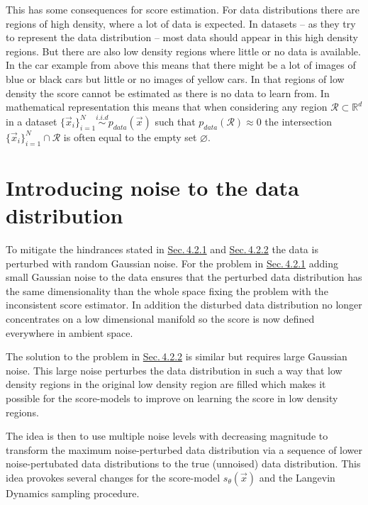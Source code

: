 This has some consequences for score estimation. For data distributions there are regions of high density, where a lot of data is expected. In datasets – as they try to represent the data distribution – most data should appear in this high density regions. But there are also low density regions where little or no data is available. In the car example from above this means that there might be a lot of images of blue or black cars but little or no images of yellow cars. In that regions of low density the score cannot be estimated as there is no data to learn from. In mathematical representation this means that when considering any region $\mathcal{R}\subset\mathbb{R}^d$ in a dataset $\{\vec{x}_i\}_{i=1}^N\overset{i.i.d}{\sim}p_{data}(\vec{x})$ such that $p_{data}(\mathcal{R})\approx0$ the intersection $\{\vec{x}_i\}_{i=1}^N\cap\mathcal{R}$ is often equal to the empty set $\varnothing$. 

\section[Introducing noise to the data distribution]{Introducing noise to the data distribution%
    } \label{sec:4.3}
To mitigate the hindrances stated in \hyperref[sec:4.2.1]{Sec.\,4.2.1} and \hyperref[sec:4.2.2]{Sec.\,4.2.2} the data is perturbed with random Gaussian noise. For the problem in \hyperref[sec:4.2.1]{Sec.\,4.2.1} adding small Gaussian noise to the data ensures that the perturbed data distribution has the same dimensionality than the whole space fixing the problem with the inconsistent score estimator. In addition the disturbed data distribution no longer concentrates on a low dimensional manifold so the score is now defined everywhere in ambient space.

The solution to the problem in \hyperref[sec:4.2.2]{Sec.\,4.2.2} is similar but requires large Gaussian noise. This large noise perturbes the data distribution in such a way that low density regions in the original low density region are filled which makes it possible for the score-models to improve on learning the score in low density regions.

The idea is then to use multiple noise levels with decreasing magnitude to transform the maximum noise-perturbed data distribution via a sequence of lower noise-pertubated data distributions to the true (unnoised) data distribution. This idea provokes several changes for the score-model $s_\theta(\vec{x})$ and the Langevin Dynamics sampling procedure. 
%
